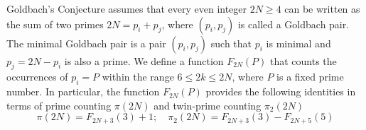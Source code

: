 Goldbach's Conjecture assumes that every even integer $2N \geq 4$ can be written as the sum of two primes
$2N = p_i + p_j$, where $(p_i, p_j)$ is called a Goldbach pair.
The minimal Goldbach pair is a pair $(p_i, p_j)$ such that $p_i$ is minimal and $p_j = 2N - p_i$ is also a prime.
We define a function $F_{2N}(P)$ that counts the occurrences of $p_i = P$ within the range $6 \leq 2k \leq 2N$,
where $P$ is a fixed prime number.
In particular, the function $F_{2N}(P)$ provides the following identities in terms of prime counting $\pi(2N)$ and
twin-prime counting $\pi_2(2N)$
\[
    \pi(2N) = F_{2N+3}(3) + 1; \quad \pi_2(2N) = F_{2N+3}(3) - F_{2N+5}(5)
\]
